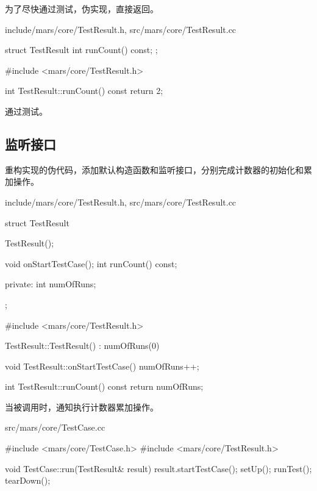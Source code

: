 \begin{content}
为了尽快通过测试，伪实现，直接返回。

\begin{diff}{include/mars/core/TestResult.h, src/mars/core/TestResult.cc}
 \begin{minicpp}
struct TestResult {
  int runCount() const;
};
 \end{minicpp}
\tcblower
 \begin{minicpp}
#include <mars/core/TestResult.h>

int TestResult::runCount() const {
  return 2;
}
 \end{minicpp}
\end{diff}

通过测试。

\subsection{监听接口}

重构实现的伪代码，添加默认构造函数和监听接口，分别完成计数器的初始化和累加操作。

\begin{diff}{include/mars/core/TestResult.h, src/mars/core/TestResult.cc}
 \begin{minicpp}
struct TestResult {
  TestResult();

  void onStartTestCase();
  int runCount() const;

private:
  int numOfRuns;
};
 \end{minicpp}
\tcblower
 \begin{minicpp}
#include <mars/core/TestResult.h>

TestResult::TestResult() : numOfRuns(0) {
}

void TestResult::onStartTestCase() {
  numOfRuns++;
}

int TestResult::runCount() const {
  return numOfRuns;
}
 \end{minicpp}
\end{diff}

当被调用时，通知执行计数器累加操作。

\begin{nodiff}{src/mars/core/TestCase.cc}
 \begin{c++}
#include <mars/core/TestCase.h>
#include <mars/core/TestResult.h>

void TestCase::run(TestResult& result) {
  result.startTestCase();
  setUp();
  runTest();
  tearDown();
}
 \end{c++}
\end{nodiff}


\end{content}
